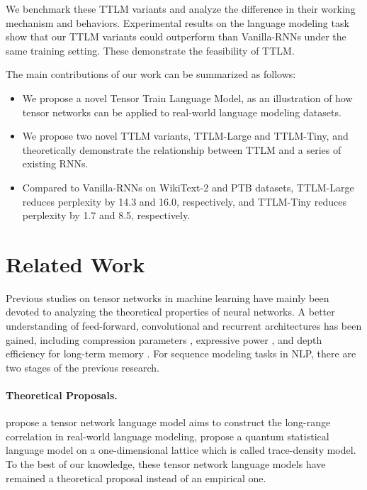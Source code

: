 \documentclass{article}
\theoremstyle{plain}
\theoremstyle{definition}
\theoremstyle{remark}
\begin{document}
We benchmark these TTLM variants and analyze the difference in their working mechanism and behaviors. Experimental results on the language modeling task show that our TTLM variants could outperform than Vanilla-RNNs under the same training setting. These demonstrate the feasibility of TTLM.
 
 
The main contributions of our work can be summarized as follows:
\begin{itemize}
    \item We propose a novel Tensor Train Language Model, as an illustration of how tensor networks can be applied to real-world language modeling datasets. 
    \item We propose two novel TTLM variants, TTLM-Large and TTLM-Tiny, and theoretically demonstrate the relationship between  TTLM and a series of existing RNNs.
    \item Compared to Vanilla-RNNs on WikiText-2 and PTB datasets, TTLM-Large reduces perplexity by 14.3 and 16.0, respectively, and TTLM-Tiny reduces perplexity by 1.7 and 8.5, respectively.
\end{itemize}


\section{Related Work}

Previous studies on tensor networks in machine learning have mainly been devoted to analyzing the theoretical properties of neural networks. A better understanding of feed-forward, convolutional and recurrent architectures has been gained, including compression parameters \citep{novikov2015tensorizing}, expressive power \citep{cohen2016expressive, cohen2016convolutional, khrulkov2018expressive}, and depth efficiency for long-term memory \citep{levine2018benefits}. For sequence modeling tasks in NLP, there are two stages of the previous research.

\paragraph{Theoretical Proposals.}
\citep{pestun2017tensor} propose a tensor network language model aims to construct the long-range correlation in real-world language modeling, \citep{pestun2017language} propose a quantum statistical language model on a one-dimensional lattice which is called trace-density model. 
To the best of our knowledge, these tensor network language models have remained a theoretical proposal instead of an empirical one. 
\end{document}
